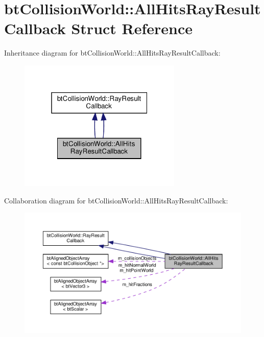 \hypertarget{structbtCollisionWorld_1_1AllHitsRayResultCallback}{}\section{bt\+Collision\+World\+:\+:All\+Hits\+Ray\+Result\+Callback Struct Reference}
\label{structbtCollisionWorld_1_1AllHitsRayResultCallback}


Inheritance diagram for bt\+Collision\+World\+:\+:All\+Hits\+Ray\+Result\+Callback\+:
\nopagebreak
\begin{figure}[H]
\begin{center}
\leavevmode
\includegraphics[width=220pt]{structbtCollisionWorld_1_1AllHitsRayResultCallback__inherit__graph}
\end{center}
\end{figure}


Collaboration diagram for bt\+Collision\+World\+:\+:All\+Hits\+Ray\+Result\+Callback\+:
\nopagebreak
\begin{figure}[H]
\begin{center}
\leavevmode
\includegraphics[width=350pt]{structbtCollisionWorld_1_1AllHitsRayResultCallback__coll__graph}
\end{center}
\end{figure}

